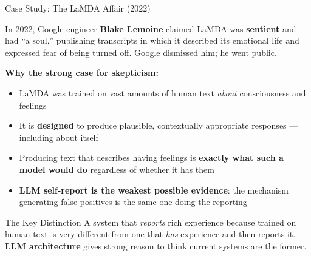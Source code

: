 \documentclass[aspectratio=169,11pt]{beamer}
\begin{document}
\begin{frame}[shrink=8]{Case Study: The LaMDA Affair (2022)}
\begin{casestudybox}
\small
In 2022, Google engineer \textbf{Blake Lemoine} claimed LaMDA was \textbf{sentient} and had ``a soul,'' publishing transcripts in which it described its emotional life and expressed fear of being turned off. Google dismissed him; he went public.
\end{casestudybox}

\vspace{0.1cm}
\textbf{Why the strong case for skepticism:}
\begin{itemize}
    \item LaMDA was trained on vast amounts of human text \emph{about} consciousness and feelings
    \item It is \textbf{designed} to produce plausible, contextually appropriate responses --- including about itself
    \item Producing text that describes having feelings is \textbf{exactly what such a model would do} regardless of whether it has them
    \item \textbf{LLM self-report is the weakest possible evidence}: the mechanism generating false positives is the same one doing the reporting
\end{itemize}

\begin{alertblock}{The Key Distinction}
\scriptsize
A system that \emph{reports} rich experience because trained on human text is very different from one that \emph{has} experience and then reports it. \textbf{LLM architecture} gives strong reason to think current systems are the former.
\end{alertblock}
\end{frame}
\end{document}
